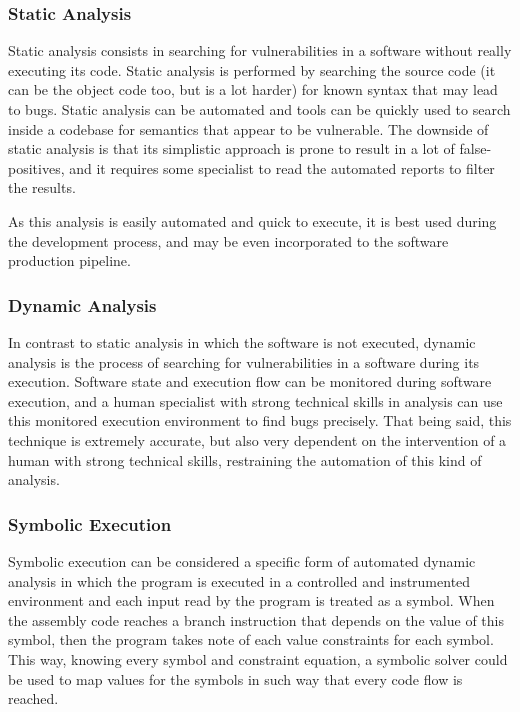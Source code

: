 \subsubsection{Static Analysis}

Static analysis consists in searching for vulnerabilities in a software without really executing its code. Static analysis is performed by searching the source code (it can be the object code too, but is a lot harder) for known syntax that may lead to bugs. Static analysis can be automated and tools can be quickly used to search inside a codebase for semantics that appear to be vulnerable. The downside of static analysis is that its simplistic approach is prone to result in a lot of false-positives, and it requires some specialist to read the automated reports to filter the results.

As this analysis is easily automated and quick to execute, it is best used during the development process, and may be even incorporated to the software production pipeline.

\subsubsection{Dynamic Analysis}

In contrast to static analysis in which the software is not executed, dynamic analysis is the process of searching for vulnerabilities in a software during its execution. Software state and execution flow can be monitored during software execution, and a human specialist with strong technical skills in analysis can use this monitored execution environment to find bugs precisely. That being said, this technique is extremely accurate, but also very dependent on the intervention of a human with strong technical skills, restraining the automation of this kind of analysis.

\subsubsection{Symbolic Execution}

Symbolic execution can be considered a specific form of automated dynamic analysis in which the program is executed in a controlled and instrumented environment and each input read by the program is treated as a symbol. When the assembly code reaches a branch instruction that depends on the value of this symbol, then the program takes note of each value constraints for each symbol. This way, knowing every symbol and constraint equation, a symbolic solver could be used to map values for the symbols in such way that every code flow is reached.

